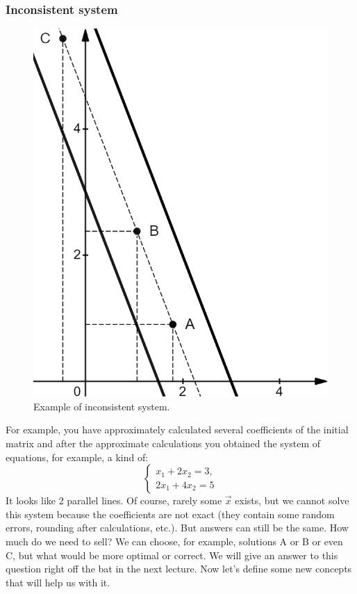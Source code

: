     \subsubsection*{Inconsistent system}
    \begin{figure}
        \includegraphics[height=0.3\columnwidth, width=0.24\columnwidth]{lectures/images/inconsistent_system_without_vectors.png}
        \caption*{\scriptsize{Example of inconsistent system.}}
        \label{fig:inconsistent}
    \end{figure}
    For example, you have approximately calculated several coefficients of the initial matrix and after the approximate calculations you obtained the system of equations, for example, a kind of: 
    \[
        \left\{ \begin{array}{c}
        x_1 + 2x_2 = 3,\\
        2x_1 + 4x_2 = 5
           \end{array}
        \right. 
    \]
    It looks like 2 parallel lines. Of course, rarely some $\vec{x}$ exists, but we cannot solve this system because the coefficients are not exact (they contain some random errors, rounding after calculations, etc.). But answers can still be the same. How much do we need to sell? We can choose, for example, solutions A or B or even C, but what would be more optimal or correct. We will give an answer to this question right off the bat in the next lecture. Now let's define some new concepts that will help us with it.
